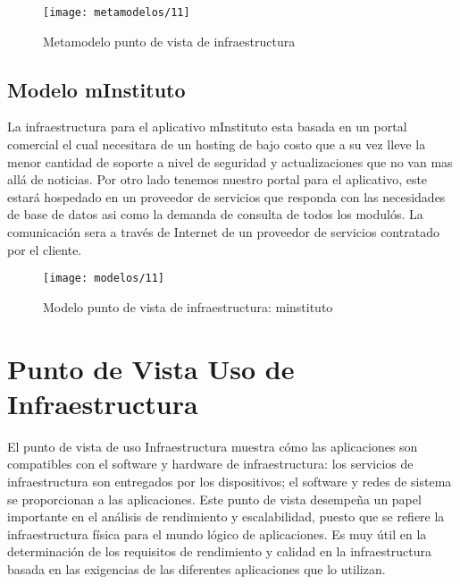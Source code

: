   \begin{figure}[H]
	\centering
	\texttt{[image: metamodelos/11]}
	\captionsetup{width=.95\textwidth}
	\caption{Metamodelo punto de vista de infraestructura}
	\label{metamodelo11}
  \end{figure}

  \subsection{Modelo mInstituto}
  La infraestructura para el aplicativo mInstituto esta basada en un portal comercial el cual necesitara de un hosting de bajo costo que a su vez lleve la menor cantidad de soporte a nivel de seguridad y actualizaciones que no van mas allá de noticias. Por otro lado tenemos nuestro portal para el aplicativo, este estará hospedado en un proveedor de servicios que responda con las necesidades de base de datos asi como la demanda de consulta de todos los modulós. La comunicación sera a través de Internet de un proveedor de servicios contratado por el cliente.
  
  \begin{figure}[H]
	\centering
	\texttt{[image: modelos/11]}
 	\captionsetup{width=.95\textwidth}
	\caption{Modelo punto de vista de infraestructura: minstituto}
	\label{modelo11}
  \end{figure}
  
  \section{Punto de Vista Uso de Infraestructura}
  El punto de vista de uso Infraestructura muestra cómo las aplicaciones son compatibles con el software y hardware de infraestructura: los servicios de infraestructura son entregados por los dispositivos; el software y redes de sistema se proporcionan a las aplicaciones. Este punto de vista desempeña un papel importante en el análisis de rendimiento y escalabilidad, puesto que se refiere la infraestructura física para el mundo lógico de aplicaciones. Es muy útil en la determinación de los requisitos de rendimiento y calidad en la infraestructura basada en las exigencias de las diferentes aplicaciones que lo utilizan.
  
